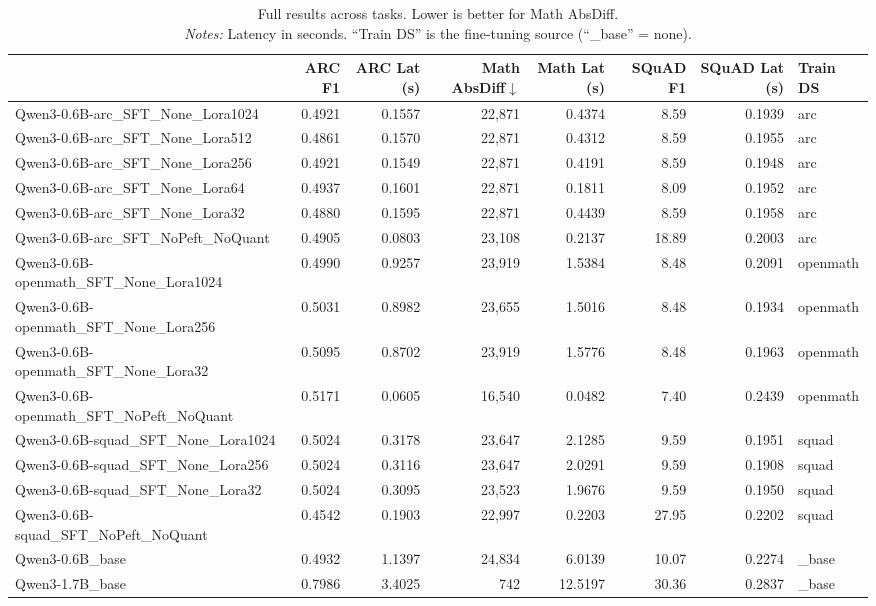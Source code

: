 \documentclass[11pt,a4paper]{article}
\begin{document}
\begin{table}[htbp]
\centering
\caption{Full results across tasks. Lower is better for Math AbsDiff.\\
\footnotesize\emph{Notes:} Latency in seconds. ``Train DS'' is the fine-tuning source (``\_base'' = none).}
\label{tab:full}
\footnotesize
\begin{adjustbox}{max width=\textwidth}
\begin{tabular}{lrrrrrrl}
\toprule
{} &  ARC F1 & ARC Lat (s) & Math AbsDiff$\downarrow$ & Math Lat (s) & SQuAD F1 & SQuAD Lat (s) & Train DS \\
\midrule
Qwen3-0.6B-arc\_SFT\_None\_Lora1024 &  0.4921 & 0.1557 & 22,871 & 0.4374 &  8.59 & 0.1939 & arc \\
Qwen3-0.6B-arc\_SFT\_None\_Lora512  &  0.4861 & 0.1570 & 22,871 & 0.4312 &  8.59 & 0.1955 & arc \\
Qwen3-0.6B-arc\_SFT\_None\_Lora256  &  0.4921 & 0.1549 & 22,871 & 0.4191 &  8.59 & 0.1948 & arc \\
Qwen3-0.6B-arc\_SFT\_None\_Lora64   &  0.4937 & 0.1601 & 22,871 & 0.1811 &  8.09 & 0.1952 & arc \\
Qwen3-0.6B-arc\_SFT\_None\_Lora32   &  0.4880 & 0.1595 & 22,871 & 0.4439 &  8.59 & 0.1958 & arc \\
Qwen3-0.6B-arc\_SFT\_NoPeft\_NoQuant & 0.4905 & 0.0803 & 23,108 & 0.2137 & 18.89 & 0.2003 & arc \\
Qwen3-0.6B-openmath\_SFT\_None\_Lora1024 & 0.4990 & 0.9257 & 23,919 & 1.5384 &  8.48 & 0.2091 & openmath \\
Qwen3-0.6B-openmath\_SFT\_None\_Lora256  & 0.5031 & 0.8982 & 23,655 & 1.5016 &  8.48 & 0.1934 & openmath \\
Qwen3-0.6B-openmath\_SFT\_None\_Lora32   & 0.5095 & 0.8702 & 23,919 & 1.5776 &  8.48 & 0.1963 & openmath \\
Qwen3-0.6B-openmath\_SFT\_NoPeft\_NoQuant & 0.5171 & 0.0605 & 16,540 & 0.0482 &  7.40 & 0.2439 & openmath \\
Qwen3-0.6B-squad\_SFT\_None\_Lora1024 & 0.5024 & 0.3178 & 23,647 & 2.1285 &  9.59 & 0.1951 & squad \\
Qwen3-0.6B-squad\_SFT\_None\_Lora256  & 0.5024 & 0.3116 & 23,647 & 2.0291 &  9.59 & 0.1908 & squad \\
Qwen3-0.6B-squad\_SFT\_None\_Lora32   & 0.5024 & 0.3095 & 23,523 & 1.9676 &  9.59 & 0.1950 & squad \\
Qwen3-0.6B-squad\_SFT\_NoPeft\_NoQuant & 0.4542 & 0.1903 & 22,997 & 0.2203 & 27.95 & 0.2202 & squad \\
Qwen3-0.6B\_base                     & 0.4932 & 1.1397 & 24,834 & 6.0139 & 10.07 & 0.2274 & \_base \\
Qwen3-1.7B\_base                     & 0.7986 & 3.4025 &    742 &12.5197 & 30.36 & 0.2837 & \_base \\
\bottomrule
\end{tabular}
\end{adjustbox}
\end{table}
\end{document}
